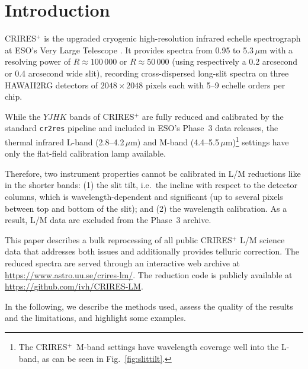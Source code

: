 \documentclass{aa}
\newcommand{\crires}{CRIRES$^+$}
\newcommand{\um}{$\mu$m}
\newcommand{\crtwores}{\texttt{cr2res}}
\begin{document}

\maketitle
\nolinenumbers

\section{Introduction}
\label{sec:intro}

\crires{} is the upgraded cryogenic high-resolution infrared echelle
spectrograph at ESO's Very Large Telescope \citep{Dorn2023}. It provides
spectra from 0.95 to 5.3\,\um{} with a
resolving power of $R \approx 100\,000$ or $R \approx 50\,000$ (using respectively 
a 0.2 arcsecond or 0.4 arcsecond wide slit), recording cross-dispersed long-slit
spectra on three HAWAII2RG detectors of $2048 \times 2048$ pixels each 
with 5--9 echelle orders per chip.

While the $YJHK$ bands of \crires{} are fully reduced and calibrated by
the standard \crtwores{} pipeline \citep{cr2res} and included in ESO's
Phase~3 data releases, the thermal infrared L-band (2.8--4.2\,\um) and
M-band (4.4--5.5\,\um)\footnote{The \crires\ M-band settings have wavelength coverage
 well into the L-band, as can be seen in Fig.~\ref{fig:slittilt}.}
 settings have only the flat-field calibration lamp
available.

Therefore, two instrument properties cannot be calibrated in
L/M reductions like in the shorter bands: (1) the slit tilt, i.e.~the incline with respect to
the detector columns, which is 
wavelength-dependent and significant (up to several pixels between top and bottom
of the slit); and (2) the wavelength calibration.
As a result, L/M data are excluded from the Phase~3
archive. 

This paper describes a bulk reprocessing of all public \crires{} L/M
science data that addresses both issues and additionally provides telluric
correction. The reduced spectra are served through an interactive web
archive at \url{https://www.astro.uu.se/crires-lm/}. The reduction
code is publicly available at
\url{https://github.com/ivh/CRIRES-LM}.

In the following, we describe the methods used, assess the quality of the results
and the limitations, and highlight some examples.
\end{document}
